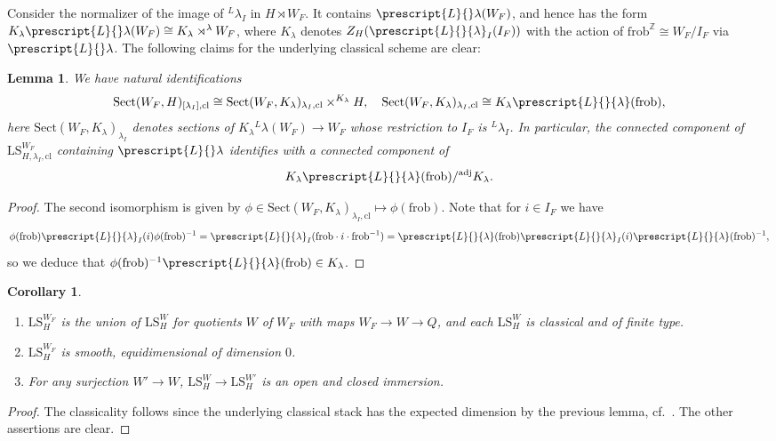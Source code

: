 \documentclass{amsart}
\newtheorem{lemma}[theorem]{Lemma}
\newtheorem{corollary}[theorem]{Corollary}
\theoremstyle{definition}
\theoremstyle{remark}
\numberwithin{equation}{section}
\newcommand{\Z}{\mathbb{Z}}
\newcommand{\co}[1]{\prescript{#1}{}}
\newcommand{\frob}{\mathrm{frob}}
\newcommand{\cl}{\mathrm{cl}}
\newcommand{\LS}{\mathrm{LS}}
\newcommand{\Sect}{\mathrm{Sect}}
\newcommand{\adj}{\mathrm{adj}}
\begin{document}
Consider the normalizer of the image of ${}^L \lambda_I$ in $H \rtimes W_F$. It contains $\co{L}\lambda (W_F)$, and hence has the form $K_{\lambda}\co{L}\lambda(W_F)\cong K_{\lambda}\rtimes^\lambda W_F$, where $K_\lambda$ denotes $Z_{H}(\co{L}{\lambda}_I(I_F))$ with the action of $\frob^\Z\cong W_F/I_F$ via $\co{L}\lambda$. The following claims for the underlying classical scheme are clear:

\begin{lemma}
We have natural identifications
\[
\Sect(W_F, H)_{[\lambda_I], \cl}\cong \Sect (W_F, K_{\lambda})_{\lambda_I, \cl}\times^{K_\lambda}H, \quad 
\Sect(W_F, K_\lambda)_{\lambda_I,\cl}\cong K_\lambda\co{L}{\lambda}(\frob), 
\]
here $\Sect(W_F, K_\lambda)_{\lambda_I}$ denotes sections of $K_\lambda {}^L \lambda (W_F)\to W_F$ whose restriction to $I_F$ is ${}^L\lambda_I$. 
In particular, the connected component of $\LS_{H, \lambda_I, \cl}^{W_F}$ containing $\co{L}\lambda$ identifies with a connected component of
\[
K_\lambda \co{L}{\lambda}(\frob)/^\adj K_\lambda. 
\]
\end{lemma}

\begin{proof}
The second isomorphism is given by $\phi \in \Sect(W_F, K_{\lambda})_{\lambda_I, \cl} \mapsto \phi(\frob)$. Note that for $i \in I_F$ we have 
\begin{equation*}
    \phi(\frob) \co{L}{\lambda}_I(i)\phi(\frob)^{-1} = \co{L}{\lambda}_I(\frob \cdot i \cdot \frob^{-1}) = \co{L}{\lambda}(\frob) \co{L}{\lambda}_I(i) \co{L}{\lambda}(\frob)^{-1},
\end{equation*}
so we deduce that $\phi(\frob)^{-1}\co{L}{\lambda}(\frob) \in K_{\lambda}$.
\end{proof}

\begin{corollary}
\begin{enumerate}
    \item $\LS_H^{W_F}$ is the union of $\LS_H^W$ for quotients $W$ of $W_F$ with maps $W_F\to W\to Q$, and each $\LS_H^W$ is classical and of finite type. 
    \item $\LS_H^{W_F}$ is smooth, equidimensional of dimension $0$. 
    \item For any surjection $W'\to W$, $\LS_H^W\to \LS_H^{W'}$ is an open and closed immersion. 
\end{enumerate}    
\end{corollary}

\begin{proof}
The classicality follows since the underlying classical stack has the expected dimension by the previous lemma, cf.~\cite[Proposition 2.19]{Zhu}. The other assertions are clear. 
\end{proof}
\end{document}
